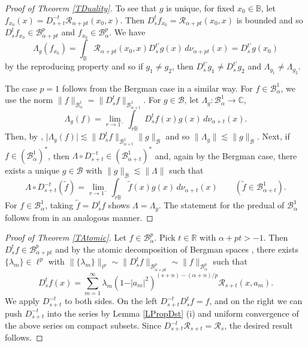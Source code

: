 \documentclass{amsart}
\theoremstyle{definition}
\theoremstyle{remark}
\begin{document}
\begin{proof}[Proof of Theorem \ref{TDuality}]
To see that $g$ is unique, for fixed $x_0\in\mathbb B$, let
$f_{x_0}(x)=D^{-t}_{s+t}\mathcal R_{\alpha+pt}(x_0,x)$.
Then $D^t_s f_{x_0}=\mathcal R_{\alpha+pt}(x_0,x)$ is bounded
and so $D^t_s f_{x_0}\in\mathcal B^p_{\alpha+pt}$ and
$f_{x_0}\in\mathcal B^p_\alpha$.
We have
\begin{equation*}
\Lambda_g(f_{x_0})=\int_{\mathbb B}\mathcal R_{\alpha+pt}(x_0,x)
D^{t'}_sg(x)\,d\nu_{\alpha+pt}(x)
=D^{t'}_sg(x_0)
\end{equation*}
by the reproducing property and so if $g_1\neq g_2$, then
$D^{t'}_sg_1\neq D^{t'}_s g_2$ and $\Lambda_{g_1}\neq\Lambda_{g_2}$.

The case $p=1$ follows from the Bergman case
\cite[Theorem 1.3]{U3} in a similar way.
For $f\in\mathcal B^1_\alpha$, we use the norm
$\|f\|_{\mathcal B^1_\alpha}=\|D^t_s f\|_{\mathcal B^1_{\alpha+t}}$.
For $g\in\mathcal B$,
let $\Lambda_g\colon\mathcal B^1_\alpha\to\mathbb C$,
\begin{equation*}
\Lambda_g(f)
=\lim_{r\to 1^-}\int_{r\mathbb B} D^t_s f(x)g(x)\,d\nu_{\alpha+t}(x).
\end{equation*}
Then, by \cite[Eqn~6.1]{U3},
$\vert\Lambda_g(f)\vert
\lesssim \|D^t_s f\|_{\mathcal B^1_{\alpha+t}}\|g\|_{\mathcal B}$
and so $\|\Lambda_g\|\lesssim\|g\|_{\mathcal B}$.
Next, if $f\in(\mathcal B^1_\alpha)^*$, then
$\Lambda\circ D^{-t}_{s+t}\in(\mathcal B^1_{\alpha+t})^*$
and, again by the Bergman case, there exists a unique $g\in\mathcal B$
with $\|g\|_{\mathcal B}\lesssim \|\Lambda\|$ such that
\begin{equation*}
\Lambda\circ D^{-t}_{s+t}(\tilde{f})
=\lim_{r\to 1^-}\int_{r\mathbb B}\tilde{f}(x)g(x)\,d\nu_{\alpha+t}(x)
\qquad (\tilde{f}\in\mathcal B^1_{\alpha+t}).
\end{equation*}
For $f\in\mathcal B^1_\alpha$, taking $\tilde{f}=D^t_s f$ shows
$\Lambda=\Lambda_g$.
The statement for the predual of $\mathcal B^1_\alpha$ follows
from \cite[Theorem 1.2]{U3} in an analogous manner.
\end{proof}

\begin{proof}[Proof of Theorem \ref{TAtomic}]
Let $f\in\mathcal B^p_\alpha$.
Pick $t\in\mathbb R$ with $\alpha+pt>-1$.
Then $D^t_s f\in\mathcal B^p_{\alpha+pt}$ and by the atomic
decomposition of Bergman spaces \cite[Theorem 1.1 and Eqn.~(5)]{U2},
there exists $\{\lambda_m\}\in\ell^p$ with
$\|\{\lambda_m\}\|_{\ell^p}\sim \|D^t_s f\|_{\mathcal B^p_{\alpha+pt}}
\sim\|f\|_{\mathcal B^p_\alpha}$ such that
\begin{equation*}
D^t_s f(x)=\sum_{m=1}^\infty
\lambda_m(1-\vert a_m\vert^2)^{(s+n)-(\alpha+n)/p}
\mathcal R_{s+t}(x,a_m).
\end{equation*}
We apply $D^{-t}_{s+t}$ to both sides.
On the left $D^{-t}_{s+t}D^t_s f=f$, and on the right we can push
$D^{-t}_{s+t}$ into the series by Lemma \ref{LPropDst} (i) and uniform
convergence of the above series on compact subsets.
Since $D^{-t}_{s+t}\mathcal R_{s+t}=\mathcal R_s$, the desired result
follows.
\end{proof}
\end{document}
